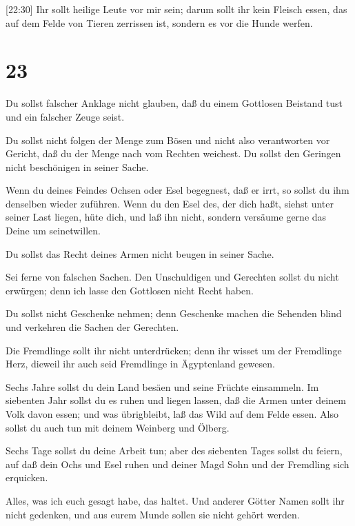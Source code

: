  {[}22:30{]} Ihr sollt heilige Leute vor mir sein; darum
sollt ihr kein Fleisch essen, das auf dem Felde von Tieren zerrissen
ist, sondern es vor die Hunde werfen.

\hypertarget{section-22}{%
\section{23}\label{section-22}}

 Du sollst falscher Anklage nicht glauben, daß du einem
Gottlosen Beistand tust und ein falscher Zeuge seist.

 Du sollst nicht folgen der Menge zum Bösen und nicht also
verantworten vor Gericht, daß du der Menge nach vom Rechten weichest.
 Du sollst den Geringen nicht beschönigen in seiner Sache.

 Wenn du deines Feindes Ochsen oder Esel begegnest, daß er
irrt, so sollst du ihm denselben wieder zuführen.  Wenn du
den Esel des, der dich haßt, siehst unter seiner Last liegen, hüte dich,
und laß ihn nicht, sondern versäume gerne das Deine um seinetwillen.

 Du sollst das Recht deines Armen nicht beugen in seiner
Sache.

 Sei ferne von falschen Sachen. Den Unschuldigen und
Gerechten sollst du nicht erwürgen; denn ich lasse den Gottlosen nicht
Recht haben.

 Du sollst nicht Geschenke nehmen; denn Geschenke machen die
Sehenden blind und verkehren die Sachen der Gerechten.

 Die Fremdlinge sollt ihr nicht unterdrücken; denn ihr
wisset um der Fremdlinge Herz, dieweil ihr auch seid Fremdlinge in
Ägyptenland gewesen.

 Sechs Jahre sollst du dein Land besäen und seine Früchte
einsammeln.  Im siebenten Jahr sollst du es ruhen und
liegen lassen, daß die Armen unter deinem Volk davon essen; und was
übrigbleibt, laß das Wild auf dem Felde essen. Also sollst du auch tun
mit deinem Weinberg und Ölberg.

 Sechs Tage sollst du deine Arbeit tun; aber des siebenten
Tages sollst du feiern, auf daß dein Ochs und Esel ruhen und deiner Magd
Sohn und der Fremdling sich erquicken.

 Alles, was ich euch gesagt habe, das haltet. Und anderer
Götter Namen sollt ihr nicht gedenken, und aus eurem Munde sollen sie
nicht gehört werden.

